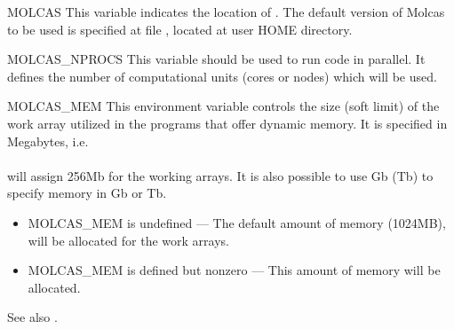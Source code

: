 \begin{variablelist}
\item[MOLCAS]
This variable indicates the location of \molcas. The default version of Molcas
to be used is specified at file , located at user HOME directory.
\item[MOLCAS\_NPROCS]
This variable should be used to run \molcas code in parallel. It defines the
number of computational units (cores or nodes) which will be used.
\item[MOLCAS\_MEM]
This environment variable controls the size (soft limit) of the
work array utilized in the programs that offer dynamic memory.
It is specified in Megabytes, i.e. \\
\\
will assign 256Mb for the working arrays.
It is also possible to use Gb (Tb) to specify memory in Gb or Tb.
\begin{itemize}
\item MOLCAS\_MEM is undefined --- The default amount of memory (1024MB),
will be allocated for the work arrays.
\item MOLCAS\_MEM is defined but nonzero --- This amount of memory
will be allocated.
\end{itemize}
See also .
\end{variablelist}


